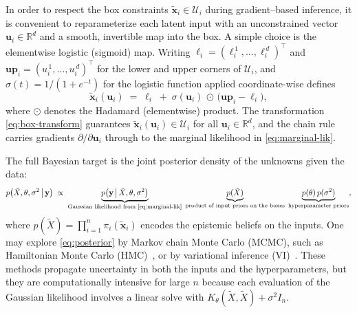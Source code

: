 \documentclass[journal]{new-aiaa}
\newcommand{\x}{\mathbf{x}}
\begin{document}
In order to respect the box constraints $\tilde{\x}_i\in\mathcal{U}_i$ during gradient–based inference, it is convenient to reparameterize each latent input with an unconstrained vector $\mathbf{u}_i\in\mathbb{R}^d$ and a smooth, invertible map into the box. A simple choice is the elementwise logistic (sigmoid) map. Writing $\boldsymbol{\ell}_i=(\ell_i^{\,1},\ldots,\ell_i^{\,d})^\top$ and $\mathbf{u\!p}_i=(u_i^{\,1},\ldots,u_i^{\,d})^\top$ for the lower and upper corners of $\mathcal{U}_i$, and $\sigma(t)=1/(1+e^{-t})$ for the logistic function applied coordinate-wise defines
\begin{equation}
\label{eq:box-transform}
\tilde{\x}_i(\mathbf{u}_i) \;=\; \boldsymbol{\ell}_i \;+\; \sigma(\mathbf{u}_i)\,\odot\,\big(\mathbf{u\!p}_i-\boldsymbol{\ell}_i\big),
\end{equation}
where $\odot$ denotes the Hadamard (elementwise) product. The transformation \eqref{eq:box-transform} guarantees $\tilde{\x}_i(\mathbf{u}_i)\in\mathcal{U}_i$ for all $\mathbf{u}_i\in\mathbb{R}^d$, and the chain rule carries gradients $\partial/\partial \mathbf{u}_i$ through to the marginal likelihood in \eqref{eq:marginal-lik}. 

The full Bayesian target is the joint posterior density of the unknowns given the data:
\begin{equation}
\label{eq:posterior}
p\big(\tilde{X},\theta,\sigma^2 \,\big|\, \mathbf{y}\big) \;\propto\; 
\underbrace{p\big(\mathbf{y}\,\big|\,\tilde{X},\theta,\sigma^2\big)}_{\text{Gaussian likelihood from \eqref{eq:marginal-lik}}}\;
\underbrace{p(\tilde{X})}_{\text{product of input priors on the boxes}}\;
\underbrace{p(\theta)\,p(\sigma^2)}_{\text{hyperparameter priors}},
\end{equation}
where $p(\tilde{X})=\prod_{i=1}^n \pi_i(\tilde{\x}_i)$ encodes the epistemic beliefs on the inputs. One may explore \eqref{eq:posterior} by Markov chain Monte Carlo (MCMC), such as Hamiltonian Monte Carlo (HMC)~\cite{betancourt2017conceptual}, or by variational inference (VI)~\cite{blei2017variational}. These methods propagate uncertainty in both the inputs and the hyperparameters, but they are computationally intensive for large $n$ because each evaluation of the Gaussian likelihood involves a linear solve with $K_\theta(\tilde{X},\tilde{X})+\sigma^2 I_n$.
\end{document}

